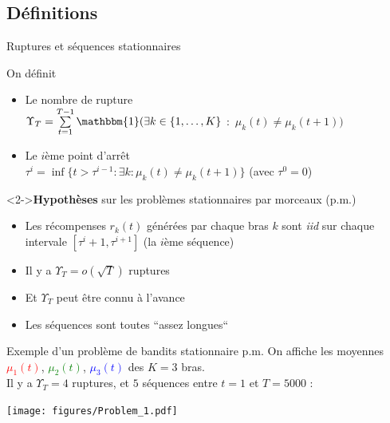 \documentclass[11pt,french,ignorenonframetext,]{beamer}
\providecommand{\tightlist}{%
  \setlength{\itemsep}{0pt}\setlength{\parskip}{0pt}}
\begin{document}
\subsection{\hfill{}Définitions\hfill{}}

\begin{frame}{Ruptures et séquences stationnaires}

  On définit

  \begin{itemize}
    \item
    Le nombre de rupture\\
    $\Upsilon_T = \sum\limits_{t=1}^{T-1} \mathbbm{1}(\exists k\in \{1,\dots,K\}$ $:$ $\mu_k(t) \neq \mu_k(t+1) )$

    \item
    Le $i$ème point d'arrêt\\
    $\tau^{i} = \inf\{t > \tau^{i-1} : \exists k : \mu_k(t) \neq \mu_k(t+1)\}$
    \hfill{} (avec $\tau^0=0$)
  \end{itemize}

  \begin{block}<2->{\textbf{Hypothèses} sur les problèmes stationnaires par morceaux (p.m.)}
    \begin{itemize}\tightlist
      \item Les récompenses $r_k(t)$ générées par chaque bras $k$ sont \alert{\emph{iid} sur chaque intervale} $[ \tau^{i} + 1, \tau^{i+1} ]$ (la $i$ème séquence)
      \item Il y a $\Upsilon_T = o(\sqrt{T})$ ruptures
      \item Et \alert{$\Upsilon_T$ peut être connu à l'avance}
      \item Les séquences sont toutes ``assez longues``
  \end{itemize}
\end{block}
\end{frame}


\begin{frame}[plain]{Exemple d'un problème de bandits stationnaire p.m.}
  On affiche les moyennes \textcolor{red}{$\mu_1(t)$}, \textcolor{green}{$\mu_2(t)$}, \textcolor{blue}{$\mu_3(t)$}
  des $K=3$ bras.\\
  Il y a $\Upsilon_T=4$ ruptures, et $5$ séquences entre $t=1$ et $T=5000$ :
  \begin{center}
    \texttt{[image: figures/Problem\_1.pdf]}
  \end{center}
\end{frame}
\end{document}
